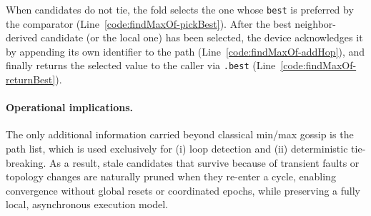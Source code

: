 \documentclass[runningheads]{llncs}
\begin{document}
When candidates do not tie, the fold selects the one whose \lstinline|best| is preferred by the comparator
(Line~\ref{code:findMaxOf-pickBest}).
%
After the best neighbor-derived candidate (or the local one) has been selected,
the device acknowledges it by appending its own identifier to the path
(Line~\ref{code:findMaxOf-addHop}),
and finally returns the selected value to the caller via \lstinline|.best|
(Line~\ref{code:findMaxOf-returnBest}).

\paragraph{Operational implications.}
The only additional information carried beyond classical min/max gossip is the path list,
which is used exclusively for (i) loop detection and (ii) deterministic tie-breaking.
As a result, stale candidates that survive because of transient faults or topology changes
are naturally pruned when they re-enter a cycle, enabling convergence without global resets or coordinated epochs,
while preserving a fully local, asynchronous execution model.

%
%
%
%
\end{document}
